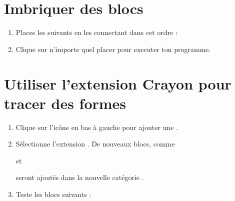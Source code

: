 
\section{Imbriquer des blocs}

\begin{enumerate}
    \item Places les \block suivants en les connectant dans cet ordre :
        \begin{scratch}
        \end{scratch}
    \item Clique sur n'importe quel \block placer pour executer ton programme.
\end{enumerate}


\section{Utiliser l'extension Crayon pour tracer des formes}

\begin{enumerate}
    \item Clique sur l'icône \sextensions{} en bas à gauche pour ajouter une .
    \item Sélectionne l'extension \spenExtension.
    De nouveaux blocs, comme
    \begin{scratch}\end{scratch}
    et
    \begin{scratch}\end{scratch}
    seront ajoutés dans la nouvelle catégorie \spen .
    \item Teste les blocs suivants :
    \begin{scratch}
    \end{scratch}
\end{enumerate}

